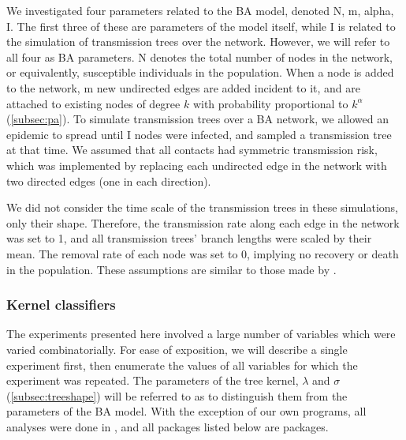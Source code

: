 We investigated four parameters related to the \gls{BA} model, denoted
\gls{N}, \gls{m}, \gls{alpha}, \gls{I}. The first three of these are parameters
of the model itself, while \gls{I} is related to the simulation of transmission
trees over the network. However, we will refer to all four as \gls{BA}
parameters. \gls{N} denotes the total number of nodes in the network, or
equivalently, susceptible individuals in the population. When a node is added
to the network, \gls{m} new undirected edges are added incident to it, and are
attached to existing nodes of degree $k$ with probability proportional to
$k^\alpha$ (\cref{subsec:pa}). To simulate transmission trees over a
\gls{BA} network, we allowed an epidemic to spread until \gls{I} nodes were
infected, and sampled a transmission tree at that time. We assumed that all
contacts had symmetric transmission risk, which was implemented by replacing
each undirected edge in the network with two directed edges (one in each
direction).

We did not consider the time scale of the transmission trees in these
simulations, only their shape. Therefore, the transmission rate along each edge
in the network was set to 1, and all transmission trees' branch lengths were
scaled by their mean. The removal rate of each node was set to 0, implying no
recovery or death in the population. These assumptions are similar to those
made by \textcite{leventhal2012inferring}.

\subsubsection*{Kernel classifiers}
\label{subsec:kernel}

The experiments presented here involved a large number of variables which were
varied combinatorially. For ease of exposition, we will describe a single
experiment first, then enumerate the values of all variables for which the
experiment was repeated. The parameters of the tree kernel, $\lambda$ and
$\sigma$ (\cref{subsec:treeshape}) will be referred to as
 to distinguish them from the parameters of the \gls{BA}
model. With the exception of our own programs, all analyses were done in
, and all packages listed below are  packages.

